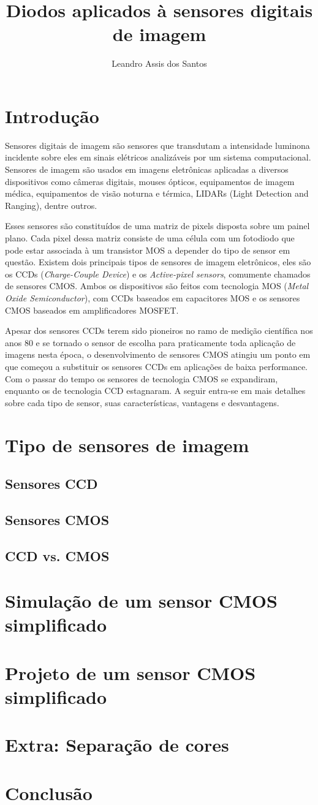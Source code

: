 \documentclass[12pt,a4paper,twocolumn]{article}
\title{\textbf{Diodos aplicados à sensores digitais de imagem}}
\author{Leandro Assis dos Santos}
\begin{document}
\maketitle

\section*{Introdução}
		Sensores digitais de imagem são sensores que transdutam a intensidade luminona incidente sobre eles em sinais elétricos analizáveis por um sistema computacional. Sensores de imagem são usados em imagens eletrônicas aplicadas a diversos dispositivos como câmeras digitais, mouses ópticos, equipamentos de imagem médica, equipamentos de visão noturna e térmica, LIDARs (Light Detection and Ranging), dentre outros.
				
		Esses sensores são constituídos de uma matriz de pixels disposta sobre um painel plano. Cada pixel dessa matriz consiste de uma célula com um fotodiodo que pode estar associada à um transistor MOS a depender do tipo de sensor em questão. Existem dois principais tipos de sensores de imagem eletrônicos, eles são os CCDs (\textit{Charge-Couple Device}) e os \textit{Active-pixel sensors}, comumente chamados de sensores CMOS. Ambos os dispositivos são feitos com tecnologia MOS (\textit{Metal Oxide Semiconductor}), com CCDs baseados em capacitores MOS e os sensores CMOS baseados em amplificadores MOSFET. 
		
		Apesar dos sensores CCDs terem sido pioneiros no ramo de medição científica nos anos 80 e se tornado o sensor de escolha para praticamente toda aplicação de imagens nesta época, o desenvolvimento de sensores CMOS atingiu um ponto em que começou a substituir os sensores CCDs em aplicações de baixa performance. Com o passar do tempo os sensores de tecnologia CMOS se expandiram, enquanto os de tecnologia CCD estagnaram. A seguir entra-se em mais detalhes sobre cada tipo de sensor, suas características, vantagens e desvantagens.
		
	\section*{Tipo de sensores de imagem}
	\subsection*{Sensores CCD}
	\subsection*{Sensores CMOS}
	\subsection*{CCD vs. CMOS}
	\section*{Simulação de um sensor CMOS simplificado}
	\section*{Projeto de um sensor CMOS simplificado}
	\section*{Extra: Separação de cores}
	\section*{Conclusão}
\end{document}
